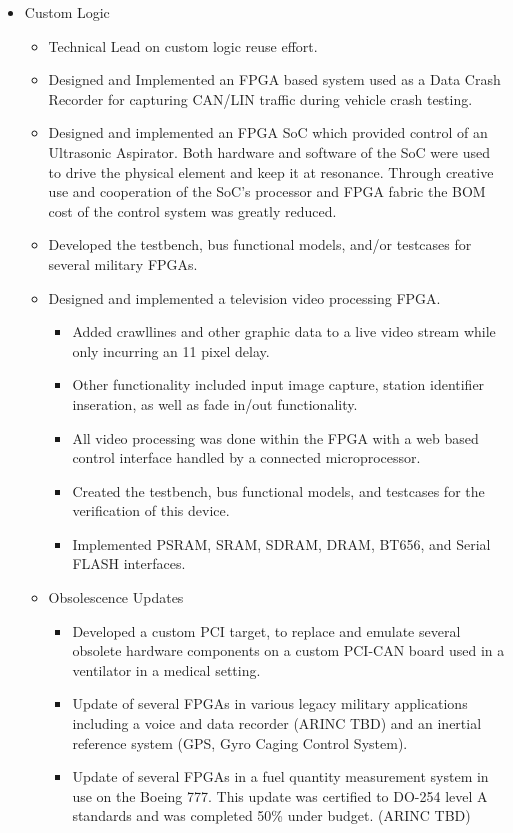 \documentclass[print]{template/friggeri-cv} %
\begin{document}
\begin{entrylist}

\listentry
{\begin{itemize}
\item Custom Logic
\begin{itemize}
\item Technical Lead on custom logic reuse effort.
\item Designed and Implemented an FPGA based system used as a Data Crash Recorder for capturing CAN/LIN traffic during vehicle crash testing.
\item Designed and implemented an FPGA SoC which provided control of an Ultrasonic Aspirator.  Both hardware and software of the SoC were used to drive the physical element and keep it at resonance.  Through creative use and cooperation of the SoC’s processor and FPGA fabric the BOM cost of the control system was greatly reduced.
\item Developed the testbench, bus functional models, and/or testcases for several military FPGAs.
\item Designed and implemented a television video processing FPGA.
\begin{itemize}
\item Added crawllines and other graphic data to a live video stream while only incurring an 11 pixel delay.
\item Other functionality included input image capture, station identifier inseration, as well as fade in/out functionality.
\item All video processing was done within the FPGA with a web based control interface handled by a connected microprocessor.
\item Created the testbench, bus functional models, and testcases for the verification of this device.
\item Implemented PSRAM, SRAM, SDRAM, DRAM, BT656, and Serial FLASH interfaces.
\end{itemize}
\item Obsolescence Updates
\begin{itemize}
\item Developed a custom PCI target, to replace and emulate several obsolete hardware components on a custom PCI-CAN board used in a ventilator in a medical setting.
\item Update of several FPGAs in various legacy military applications including a voice and data recorder (ARINC TBD) and an inertial reference system (GPS, Gyro Caging Control System).
\item Update of several FPGAs in a fuel quantity measurement system in use on the Boeing 777.  This update was certified to DO-254 level A standards and was completed 50\% under budget.  (ARINC TBD)

\end{itemize}
\end{itemize}
\end{itemize}}
\end{entrylist}
\end{document}
